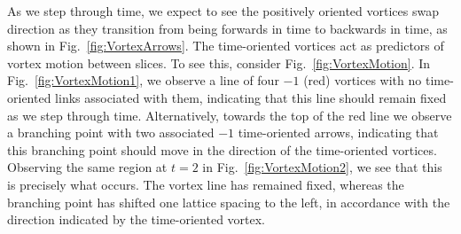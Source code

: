 As we step through time, we expect to see the positively oriented vortices swap direction as they transition from being forwards in time to backwards in time, as shown in Fig.~\ref{fig:VortexArrows}. The time-oriented vortices act as predictors of vortex motion between slices. To see this, consider Fig.~\ref{fig:VortexMotion}. In Fig.~\ref{fig:VortexMotion1}, we observe a line of four $-1$ (red) vortices with no time-oriented links associated with them, indicating that this line should remain fixed as we step through time. Alternatively, towards the top of the red line we observe a branching point with two associated $-1$ time-oriented arrows, indicating that this branching point should move in the direction of the time-oriented vortices. Observing the same region at $t=2$ in Fig.~\ref{fig:VortexMotion2}, we see that this is precisely what occurs. The vortex line has remained fixed, whereas the branching point has shifted one lattice spacing to the left, in accordance with the direction indicated by the time-oriented vortex.\\
%
